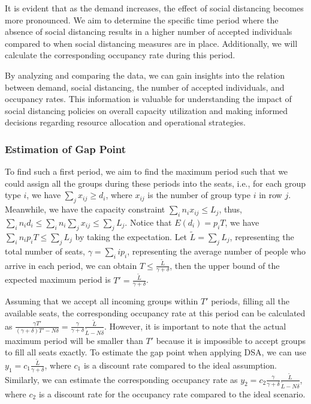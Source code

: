 It is evident that as the demand increases, the effect of social distancing becomes more pronounced. We aim to determine the specific time period where the absence of social distancing results in a higher number of accepted individuals compared to when social distancing measures are in place. Additionally, we will calculate the corresponding occupancy rate during this period.

By analyzing and comparing the data, we can gain insights into the relation between demand, social distancing, the number of accepted individuals, and occupancy rates. This information is valuable for understanding the impact of social distancing policies on overall capacity utilization and making informed decisions regarding resource allocation and operational strategies.

\subsubsection{Estimation of Gap Point}
To find such a first period, we aim to find the maximum period such that we could assign all the groups during these periods into the seats, i.e., for each group type $i$, we have $\sum_{j} x_{ij} \geq d_i$, where $x_{ij}$ is the number of group type $i$ in row $j$. Meanwhile, we have the capacity constraint $\sum_{i} n_{i} x_{ij} \leq L_j$, thus, $\sum_{i} n_i d_i \leq \sum_{i} n_i \sum_{j} x_{ij} \leq \sum_{j} L_{j}$. Notice that $E(d_i) = p_i T$, we have $\sum_{i} n_i p_i T \leq \sum_{j} L_{j}$ by taking the expectation. Let $\tilde{L} = \sum_{j} L_{j}$, representing the total number of seats, $\gamma = \sum_{i} i p_i$, representing the average number of people who arrive in each period, we can obtain $T \leq \frac{\tilde{L}}{\gamma + \delta}$, then the upper bound of the expected maximum period is $T' = \frac{\tilde{L}}{\gamma + \delta}$.


Assuming that we accept all incoming groups within $T'$ periods, filling all the available seats, the corresponding occupancy rate at this period can be calculated as $\frac{\gamma T'}{(\gamma+ \delta)T' - N \delta} = \frac{\gamma}{\gamma +\delta} \frac{\tilde{L}}{\tilde{L}-N \delta}$. However, it is important to note that the actual maximum period will be smaller than $T{'}$ because it is impossible to accept groups to fill all seats exactly. To estimate the gap point when applying DSA, we can use $y_1 = c_1 \frac{\tilde{L}}{\gamma + \delta}$, where $c_1$ is a discount rate compared to the ideal assumption. Similarly, we can estimate the corresponding occupancy rate as $y_2 = c_2 \frac{\gamma}{\gamma +\delta} \frac{\tilde{L}}{\tilde{L}-N \delta}$, where $c_2$ is a discount rate for the occupancy rate compared to the ideal scenario.


